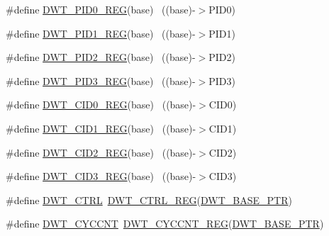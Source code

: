 \begin{DoxyCompactItemize}
\item 
\#define \hyperlink{group___d_w_t___register___accessor___macros_ga0f86233b0c83a9d6f4f1045787a2d2e1}{D\+W\+T\+\_\+\+P\+I\+D0\+\_\+\+R\+EG}(base)                                          ~((base)-\/$>$P\+I\+D0)
\item 
\#define \hyperlink{group___d_w_t___register___accessor___macros_ga3402a8a818794eaf102e1d7bfcaf3167}{D\+W\+T\+\_\+\+P\+I\+D1\+\_\+\+R\+EG}(base)                                          ~((base)-\/$>$P\+I\+D1)
\item 
\#define \hyperlink{group___d_w_t___register___accessor___macros_ga9e1b1b5093546468be7371b773b051bd}{D\+W\+T\+\_\+\+P\+I\+D2\+\_\+\+R\+EG}(base)                                          ~((base)-\/$>$P\+I\+D2)
\item 
\#define \hyperlink{group___d_w_t___register___accessor___macros_ga0cbc2af1666ca376f4593b2ee568ea1a}{D\+W\+T\+\_\+\+P\+I\+D3\+\_\+\+R\+EG}(base)                                          ~((base)-\/$>$P\+I\+D3)
\item 
\#define \hyperlink{group___d_w_t___register___accessor___macros_gab77163d0264bc009ac5622e766e24a93}{D\+W\+T\+\_\+\+C\+I\+D0\+\_\+\+R\+EG}(base)                                          ~((base)-\/$>$C\+I\+D0)
\item 
\#define \hyperlink{group___d_w_t___register___accessor___macros_ga029e546d2d8949b27c55a4785da019eb}{D\+W\+T\+\_\+\+C\+I\+D1\+\_\+\+R\+EG}(base)                                          ~((base)-\/$>$C\+I\+D1)
\item 
\#define \hyperlink{group___d_w_t___register___accessor___macros_gab6a7a7788e8fdbbe47ac13383064a1e8}{D\+W\+T\+\_\+\+C\+I\+D2\+\_\+\+R\+EG}(base)                                          ~((base)-\/$>$C\+I\+D2)
\item 
\#define \hyperlink{group___d_w_t___register___accessor___macros_ga7a29c7e2d907c373f1ffa34877e83852}{D\+W\+T\+\_\+\+C\+I\+D3\+\_\+\+R\+EG}(base)                                          ~((base)-\/$>$C\+I\+D3)
\item 
\#define \hyperlink{group___d_w_t___register___accessor___macros_ga90b9ebedff8635727698afd2fa84b90a}{D\+W\+T\+\_\+\+C\+T\+RL}~\hyperlink{group___d_w_t___register___accessor___macros_ga805e8330d1aa986d534abe1eed2614df}{D\+W\+T\+\_\+\+C\+T\+R\+L\+\_\+\+R\+EG}(\hyperlink{group___d_w_t___peripheral_ga3b46dfb2ea7946c6938028d879c82cb1}{D\+W\+T\+\_\+\+B\+A\+S\+E\+\_\+\+P\+TR})
\item 
\#define \hyperlink{group___d_w_t___register___accessor___macros_ga01aca3c6bc0f9d7b0f524442ded3f37c}{D\+W\+T\+\_\+\+C\+Y\+C\+C\+NT}~\hyperlink{group___d_w_t___register___accessor___macros_ga745c3ae737eb0e94dde4b3e1178920af}{D\+W\+T\+\_\+\+C\+Y\+C\+C\+N\+T\+\_\+\+R\+EG}(\hyperlink{group___d_w_t___peripheral_ga3b46dfb2ea7946c6938028d879c82cb1}{D\+W\+T\+\_\+\+B\+A\+S\+E\+\_\+\+P\+TR})

\end{DoxyCompactItemize}
